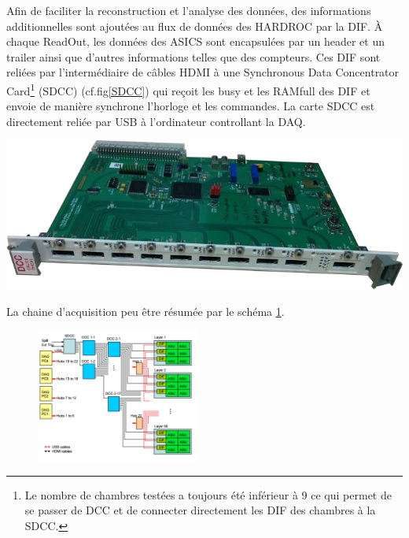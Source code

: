 Afin de faciliter la reconstruction et l'analyse des données, des informations additionnelles sont ajoutées au flux de données des HARDROC par la DIF. À chaque ReadOut, les données des ASICS sont encapsulées par un header et un trailer ainsi que d'autres informations telles que des compteurs. Ces DIF sont reliées par l'intermédiaire de câbles HDMI à une Synchronous Data Concentrator Card\footnote{Le nombre de chambres testées a toujours été inférieur à \num{9} ce qui permet de se passer de DCC et de connecter directement les DIF des chambres à la SDCC.} (SDCC) (cf.fig\ref{SDCC}) \cite{Baulieu:2015pfa} qui reçoit les busy et les RAMfull des DIF et envoie de manière synchrone l'horloge et les commandes. La carte SDCC est directement reliée par USB à l'ordinateur controllant la DAQ.

\marginpar
{
	\centering
	\includegraphics[width=\marginparwidth]{GLA/SDCC.png}
	\label{SDCC}
}


La chaine d'acquisition peu être résumée par le schéma \ref{chaine}. 

\begin{figure}[ht!]
	\centering
	\includegraphics[width=0.48\textwidth]{GLA/chaine.png}
	\label{chaine}
\end{figure}

